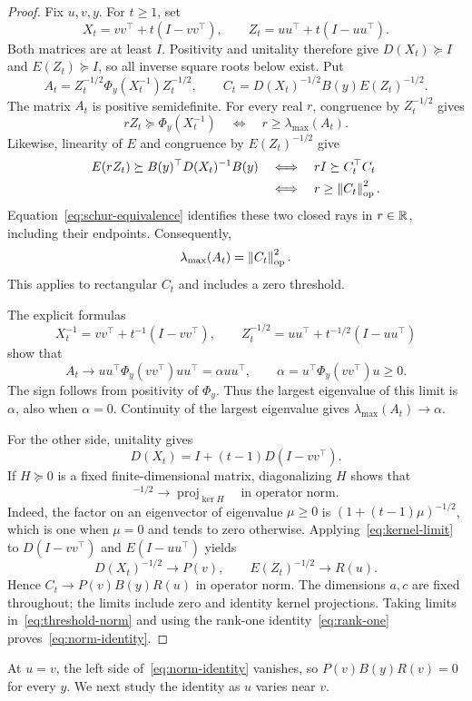 \begin{proof}
Fix $u,v,y$. For $t\geq1$, set
\[
 X_t=vv^\top+t(I-vv^\top),
 \qquad
 Z_t=uu^\top+t(I-uu^\top).
\]
Both matrices are at least $I$. Positivity and unitality therefore give
$D(X_t)\succeq I$ and $E(Z_t)\succeq I$, so all inverse square roots below
exist. Put
\[
 A_t=Z_t^{-1/2}\Phi_y(X_t^{-1})Z_t^{-1/2},
 \qquad
 C_t=D(X_t)^{-1/2}B(y)E(Z_t)^{-1/2}.
\]
The matrix $A_t$ is positive semidefinite. For every real $r$, congruence
by $Z_t^{-1/2}$ gives
\[
 rZ_t\succeq\Phi_y(X_t^{-1})
 \quad\Longleftrightarrow\quad
 r\geq\lambda_{\max}(A_t).
\]
Likewise, linearity of $E$ and congruence by $E(Z_t)^{-1/2}$ give
\[
 \begin{split}
 E(rZ_t)\succeq B(y)^\top D(X_t)^{-1}B(y)
 &\quad\Longleftrightarrow\quad rI\succeq C_t^\top C_t\\
 &\quad\Longleftrightarrow\quad r\geq\left\lVert C_t\right\rVert_{\mathrm{op}}^{2}.
 \end{split}
\]
Equation~\eqref{eq:schur-equivalence} identifies these two closed rays in
$r\in\mathbb R$, including their endpoints. Consequently,
\begin{equation}
 \lambda_{\max}(A_t)=\left\lVert C_t\right\rVert_{\mathrm{op}}^{2}.
 \label{eq:threshold-norm}
\end{equation}
This applies to rectangular $C_t$ and includes a zero threshold.

The explicit formulas
\[
 X_t^{-1}=vv^\top+t^{-1}(I-vv^\top),
 \qquad
 Z_t^{-1/2}=uu^\top+t^{-1/2}(I-uu^\top)
\]
show that
\[
 A_t\longrightarrow
 uu^\top\Phi_y(vv^\top)uu^\top
 =\alpha uu^\top,
 \qquad
 \alpha=u^\top\Phi_y(vv^\top)u\geq0.
\]
The sign follows from positivity of $\Phi_y$. Thus the largest eigenvalue
of this limit is $\alpha$, also when $\alpha=0$. Continuity of the largest
eigenvalue gives $\lambda_{\max}(A_t)\to\alpha$.

For the other side, unitality gives
\[
 D(X_t)=I+(t-1)D(I-vv^\top).
\]
If $H\succeq0$ is a fixed finite-dimensional matrix, diagonalizing $H$
shows that
\begin{equation}
 [I+(t-1)H]^{-1/2}
 \longrightarrow\operatorname{proj}_{\ker H}
 \quad\text{in operator norm}.
 \label{eq:kernel-limit}
\end{equation}
Indeed, the factor on an eigenvector of eigenvalue $\mu\geq0$ is
$(1+(t-1)\mu)^{-1/2}$, which is one when $\mu=0$ and tends to zero
otherwise. Applying~\eqref{eq:kernel-limit} to $D(I-vv^\top)$ and
$E(I-uu^\top)$ yields
\[
 D(X_t)^{-1/2}\longrightarrow P(v),
 \qquad
 E(Z_t)^{-1/2}\longrightarrow R(u).
\]
Hence $C_t\to P(v)B(y)R(u)$ in operator norm. The dimensions $a,c$ are
fixed throughout; the limits include zero and identity kernel projections.
Taking limits in~\eqref{eq:threshold-norm} and using the rank-one
identity~\eqref{eq:rank-one} proves~\eqref{eq:norm-identity}.
\end{proof}

At $u=v$, the left side of~\eqref{eq:norm-identity} vanishes, so
$P(v)B(y)R(v)=0$ for every $y$.
We next study the identity as $u$ varies near $v$.
